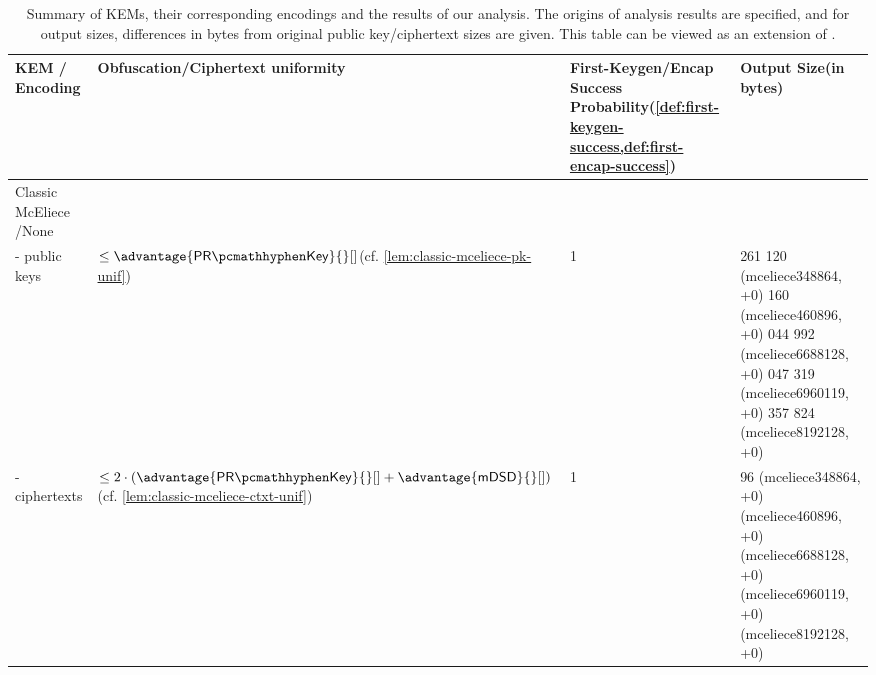 \begin{table}
    \centering
    \tiny\raggedright
    \begin{tabular}{@{} L{0.2\textwidth-\tabcolsep} | L{0.35\tabcolsep} L{0.2\tabcolsep} L{0.25\textwidth-\tabcolsep} @{}}
        \textbf{KEM /\newline Encoding} & \textbf{Obfuscation/Ciphertext uniformity} & \textbf{First-Keygen/Encap Success Probability}\newline (\cref{def:first-keygen-success,def:first-encap-success}) & \textbf{Output Size}\newline (in bytes)\\ \hline
        Classic McEliece \cite{NISTPQC-R4:ClassicMcEliece22} /\newline None & \rule{0pt}{1.2em} &  & \\
        - public keys & $\leq \advantage{\prkey}{}[]$\newline (cf. \cref{lem:classic-mceliece-pk-unif})
         & 1
         & 261 120 (\textsf{mceliece348864}, +0) 160 (\textsf{mceliece460896}, +0) 044 992 (\textsf{mceliece6688128}, +0) 047 319 (\textsf{mceliece6960119}, +0) 357 824 (\textsf{mceliece8192128}, +0)\newline \\
        - ciphertexts & $\leq 2 \cdot \left( \advantage{\prkey}{}[] + \advantage{\mdsd}{}[] \right)$\newline (cf. \cref{lem:classic-mceliece-ctxt-unif})
         & 1
         & 96 (\textsf{mceliece348864}, +0) (\textsf{mceliece460896}, +0) (\textsf{mceliece6688128}, +0) (\textsf{mceliece6960119}, +0) (\textsf{mceliece8192128}, +0)\newline \\
    \end{tabular}
    \caption[
        Summary of KEMs, their corresponding encodings and the results of our analysis.
    ]{
        Summary of KEMs, their corresponding encodings and the results of our analysis. The origins of analysis results are specified, and for output sizes, differences in bytes from original public key/ciphertext sizes are given. This table can be viewed as an extension of \cite[Table~2]{CCS:GunSteVei24}.}
    \label{tab:obfuscation-summary}
\end{table}
